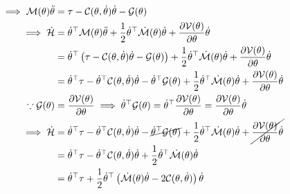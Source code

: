 \begin{align*}
    \implies
    \mathcal{M}(\theta) \ddot{\theta}
     & =
    \tau
    -
    \mathcal{C}(\theta, \dot{\theta}) \dot{\theta}
    -
    \mathcal{G}(\theta)
    \\
    \implies
    \dot{\mathcal{H}}
     & =
    \dot{\theta}^{\top} \mathcal{M}(\theta) \ddot{\theta}
    +
    \frac{1}{2}
    \dot{\theta}^{\top} \dot{\mathcal{M}}(\theta) \dot{\theta}
    +
    \frac{\partial \mathcal{V}(\theta)}{\partial \theta} \dot{\theta}
    \\
     & =
    \dot{\theta}^{\top} \left( \tau - \mathcal{C}(\theta, \dot{\theta}) \dot{\theta} - \mathcal{G}(\theta) \right)
    +
    \frac{1}{2}
    \dot{\theta}^{\top} \dot{\mathcal{M}}(\theta) \dot{\theta}
    +
    \frac{\partial \mathcal{V}(\theta)}{\partial \theta} \dot{\theta}
    \\ & =
    \dot{\theta}^{\top} \tau
    -
    \dot{\theta}^{\top} \mathcal{C}(\theta, \dot{\theta}) \dot{\theta}
    -
    \dot{\theta}^{\top} \mathcal{G}(\theta)
    +
    \frac{1}{2}
    \dot{\theta}^{\top} \dot{\mathcal{M}}(\theta) \dot{\theta}
    +
    \frac{\partial \mathcal{V}(\theta)}{\partial \theta} \dot{\theta}
    \\
    \because
    \mathcal{G}(\theta)
     & =
    \frac{\partial \mathcal{V}(\theta)}{\partial \theta}
    \implies
    \dot{\theta}^{\top} \mathcal{G}(\theta)
    =
    \dot{\theta}^{\top} \frac{\partial \mathcal{V}(\theta)}{\partial \theta}
    =
    \frac{\partial \mathcal{V}(\theta)}{\partial \theta} \dot{\theta}
    \\
    \implies
    \dot{\mathcal{H}}
     & =
    \dot{\theta}^{\top} \tau
    -
    \dot{\theta}^{\top} \mathcal{C}(\theta, \dot{\theta}) \dot{\theta}
    -
    \cancel{\dot{\theta}^{\top} \mathcal{G}(\theta)}
    +
    \frac{1}{2}
    \dot{\theta}^{\top} \dot{\mathcal{M}}(\theta) \dot{\theta}
    +
    \cancel{\frac{\partial \mathcal{V}(\theta)}{\partial \theta} \dot{\theta}}
    \\ & =
    \dot{\theta}^{\top} \tau
    -
    \dot{\theta}^{\top} \mathcal{C}(\theta, \dot{\theta}) \dot{\theta}
    +
    \frac{1}{2}
    \dot{\theta}^{\top} \dot{\mathcal{M}}(\theta) \dot{\theta}
    \\ & =
    \dot{\theta}^{\top} \tau
    +
    \frac{1}{2}
    \dot{\theta}^{\top} \left(
    \dot{\mathcal{M}}(\theta) \dot{\theta}
    -
    2 \mathcal{C}(\theta, \dot{\theta})
    \right)
    \dot{\theta}
\end{align*}
